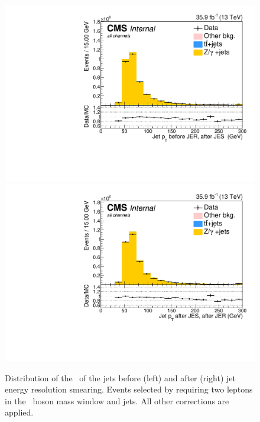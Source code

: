 \begin{figure}[htbp]
	\centering
	\includegraphics[width=0.49\linewidth]{5_Eventselection/Figures/Reweighing/2lepcontrol_dilep_JetPt_bfJER_all_Stack}
	\includegraphics[width=0.49\linewidth]{5_Eventselection/Figures/Reweighing/2lepcontrol_dilep_JetPt_afJER_all_Stack}
	\caption{Distribution of the \pt\ of the jets before (left) and after (right) jet energy resolution smearing. Events selected by requiring two leptons in the \PZ\ boson mass window and jets. All other corrections are applied.}
	\label{fig:jerSF}
\end{figure}


\newpage
